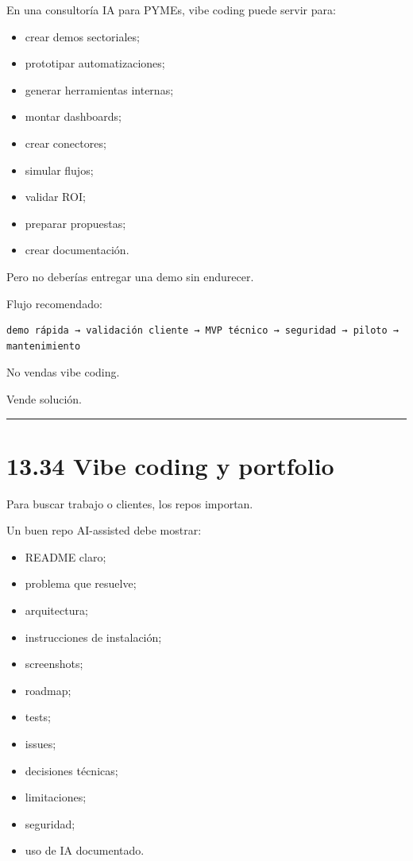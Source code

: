 En una consultoría IA para PYMEs, vibe coding puede servir para:

\begin{itemize}
\tightlist
\item
  crear demos sectoriales;
\item
  prototipar automatizaciones;
\item
  generar herramientas internas;
\item
  montar dashboards;
\item
  crear conectores;
\item
  simular flujos;
\item
  validar ROI;
\item
  preparar propuestas;
\item
  crear documentación.
\end{itemize}

Pero no deberías entregar una demo sin endurecer.

Flujo recomendado:

\begin{lstlisting}
demo rápida → validación cliente → MVP técnico → seguridad → piloto → mantenimiento
\end{lstlisting}

No vendas vibe coding.

Vende solución.

\begin{center}\rule{0.5\linewidth}{0.5pt}\end{center}

\section{13.34 Vibe coding y portfolio}\label{vibe-coding-y-portfolio}

Para buscar trabajo o clientes, los repos importan.

Un buen repo AI-assisted debe mostrar:

\begin{itemize}
\tightlist
\item
  README claro;
\item
  problema que resuelve;
\item
  arquitectura;
\item
  instrucciones de instalación;
\item
  screenshots;
\item
  roadmap;
\item
  tests;
\item
  issues;
\item
  decisiones técnicas;
\item
  limitaciones;
\item
  seguridad;
\item
  uso de IA documentado.
\end{itemize}

